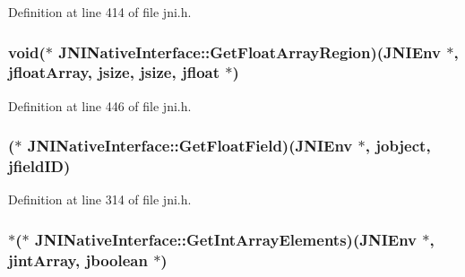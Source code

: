 Definition at line 414 of file jni.\-h.

\hypertarget{struct_j_n_i_native_interface_a47c95641425dbd87a6615b2254fde7a1}{
\subsubsection[{Get\-Float\-Array\-Region}]{\setlength{\rightskip}{0pt plus 5cm}void($\ast$ J\-N\-I\-Native\-Interface\-::\-Get\-Float\-Array\-Region)({\bf J\-N\-I\-Env} $\ast$, {\bf jfloat\-Array}, {\bf jsize}, {\bf jsize}, {\bf jfloat} $\ast$)}}\label{struct_j_n_i_native_interface_a47c95641425dbd87a6615b2254fde7a1}


Definition at line 446 of file jni.\-h.

\hypertarget{struct_j_n_i_native_interface_ab20121d97af1acfb972489e855d02498}{
\subsubsection[{Get\-Float\-Field}]{($\ast$ J\-N\-I\-Native\-Interface\-::\-Get\-Float\-Field)({\bf J\-N\-I\-Env} $\ast$, {\bf jobject}, {\bf jfield\-I\-D})}}\label{struct_j_n_i_native_interface_ab20121d97af1acfb972489e855d02498}


Definition at line 314 of file jni.\-h.

\hypertarget{struct_j_n_i_native_interface_ab5c8006dd3cef23f273daf6f5b11289f}{
\subsubsection[{Get\-Int\-Array\-Elements}]{$\ast$($\ast$ J\-N\-I\-Native\-Interface\-::\-Get\-Int\-Array\-Elements)({\bf J\-N\-I\-Env} $\ast$, {\bf jint\-Array}, {\bf jboolean} $\ast$)}}\label{struct_j_n_i_native_interface_ab5c8006dd3cef23f273daf6f5b11289f}


